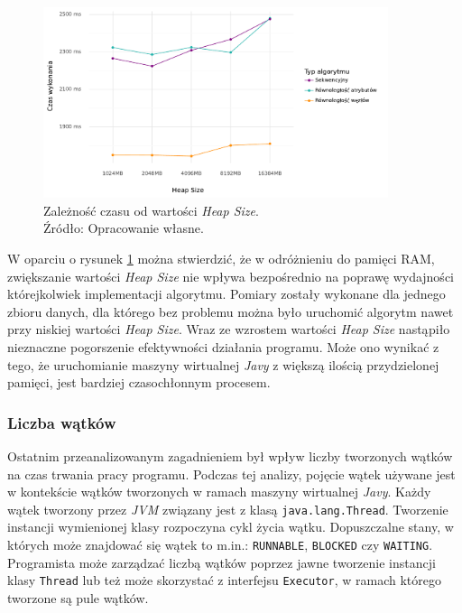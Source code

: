 \documentclass[12pt]{article}
\begin{document}
\begin{figure}[H]
    \centering
	\includegraphics[width=0.9\textwidth]{analysis-heap-size.pdf}
    \caption{Zależność czasu od wartości \textit{Heap Size}.\\Źródło: Opracowanie własne.}
    \label{fig:analysis-heap-size}
\end{figure}

W oparciu o rysunek \ref{fig:analysis-heap-size} można stwierdzić, że w odróżnieniu do pamięci RAM,
zwiększanie wartości \textit{Heap Size} nie wpływa bezpośrednio na poprawę wydajności którejkolwiek implementacji algorytmu.
Pomiary zostały wykonane dla jednego zbioru danych, dla którego bez problemu można było uruchomić algorytm nawet
przy niskiej wartości \textit{Heap Size}. Wraz ze wzrostem wartości \textit{Heap Size} nastąpiło nieznaczne pogorszenie efektywności działania programu. 
Może ono wynikać z tego, że uruchomianie maszyny wirtualnej \textit{Javy} z większą ilością przydzielonej pamięci, jest bardziej czasochłonnym procesem.

\subsubsection{Liczba wątków}
Ostatnim przeanalizowanym zagadnieniem był wpływ liczby tworzonych wątków na czas trwania
pracy programu. Podczas tej analizy, pojęcie wątek używane jest w kontekście wątków
tworzonych w ramach maszyny wirtualnej \textit{Javy}. Każdy wątek tworzony przez \textit{JVM} związany jest
z klasą \verb|java.lang.Thread|. Tworzenie instancji wymienionej klasy rozpoczyna cykl życia wątku.
Dopuszczalne stany, w których może znajdować się wątek to m.in.: \verb|RUNNABLE|, 
\verb|BLOCKED| czy \verb|WAITING|. Programista może zarządzać liczbą wątków poprzez jawne tworzenie instancji
klasy \verb|Thread| lub też może skorzystać z interfejsu \verb|Executor|, w ramach którego tworzone są pule wątków.
\end{document}

